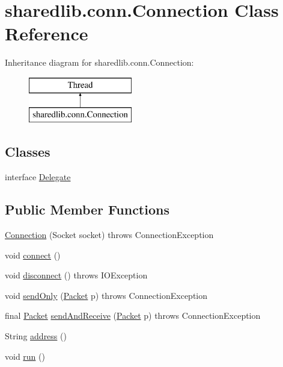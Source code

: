 \hypertarget{classsharedlib_1_1conn_1_1_connection}{}\section{sharedlib.\+conn.\+Connection Class Reference}
\label{classsharedlib_1_1conn_1_1_connection}
Inheritance diagram for sharedlib.\+conn.\+Connection\+:\begin{figure}[H]
\begin{center}
\leavevmode
\includegraphics[height=2.000000cm]{classsharedlib_1_1conn_1_1_connection}
\end{center}
\end{figure}
\subsection*{Classes}
\begin{DoxyCompactItemize}
\item 
interface \hyperlink{interfacesharedlib_1_1conn_1_1_connection_1_1_delegate}{Delegate}
\end{DoxyCompactItemize}
\subsection*{Public Member Functions}
\begin{DoxyCompactItemize}
\item 
\hyperlink{classsharedlib_1_1conn_1_1_connection_a36c23c1d5d4388af57c3b97b42aa69c2}{Connection} (Socket socket)  throws Connection\+Exception 
\item 
void \hyperlink{classsharedlib_1_1conn_1_1_connection_a9a8ee0f703a3c867d5630edb02779847}{connect} ()
\item 
void \hyperlink{classsharedlib_1_1conn_1_1_connection_a37b7b6a7358ebbc17c346dde8ffef9c1}{disconnect} ()  throws I\+O\+Exception 
\item 
void \hyperlink{classsharedlib_1_1conn_1_1_connection_a9b905c55314bb83fa7b35c5f22672276}{send\+Only} (\hyperlink{classsharedlib_1_1conn_1_1_packet}{Packet} p)  throws Connection\+Exception 
\item 
final \hyperlink{classsharedlib_1_1conn_1_1_packet}{Packet} \hyperlink{classsharedlib_1_1conn_1_1_connection_aec31a2fdc2ff6297d1906e1a70726571}{send\+And\+Receive} (\hyperlink{classsharedlib_1_1conn_1_1_packet}{Packet} p)  throws Connection\+Exception 
\item 
String \hyperlink{classsharedlib_1_1conn_1_1_connection_a1f831c20f53c52311f0350ea8a366fe7}{address} ()
\item 
void \hyperlink{classsharedlib_1_1conn_1_1_connection_a0badcffcade5330b1466a3b9cf60aee2}{run} ()
\end{DoxyCompactItemize}
